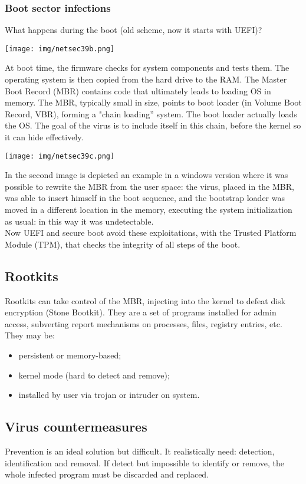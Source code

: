 \documentclass[a4paper, 10pt, titlepage]{article}
\begin{document}
\subsubsection*{Boot sector infections}
What happens during the boot (old scheme, now it starts with UEFI)?
\begin{center}
	\texttt{[image: img/netsec39b.png]}
\end{center}
At boot time, the firmware checks for system components and tests them. The operating system is then copied from the hard drive to the RAM. The Master Boot Record (MBR) contains code that ultimately leads to loading OS in memory. The MBR, typically small in size, points to boot loader (in Volume Boot Record, VBR), forming a "chain loading” system. The boot loader actually loads the OS. The goal of the virus is to include itself in this chain, before the kernel so it can hide effectively.
\begin{center}
	\texttt{[image: img/netsec39c.png]}
\end{center}
In the second image is depicted an example in a windows version where it was possible to rewrite the MBR from the user space: the virus, placed in the MBR, was able to insert himself in the boot sequence, and the bootstrap loader was moved in a different location in the memory, executing the system initialization as usual: in this way it was undetectable. \medskip\\
Now UEFI and secure boot avoid these exploitations, with the Trusted Platform Module (TPM), that checks the integrity of all steps of the boot.

\subsection*{Rootkits}
Rootkits can take control of the MBR,  injecting into the kernel to defeat disk encryption (Stone Bootkit). They are a set of programs installed for admin access, subverting report mechanisms on processes, files, registry entries, etc. They may be:
\begin{itemize}
	\item persistent or memory-based;
	\item kernel mode (hard to detect and remove);
	\item installed by user via trojan or intruder on system.
\end{itemize}

\subsection*{Virus countermeasures}
Prevention is an ideal solution but difficult. It realistically need: detection, identification and removal. If detect but impossible to identify or remove, the whole infected program must be discarded and replaced.
\end{document}
